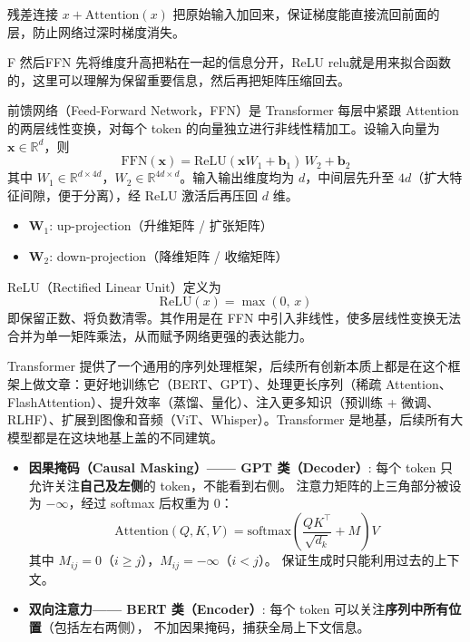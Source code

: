 \begin{note}
残差连接 $x + \mathrm{Attention}(x)$ 把原始输入加回来，保证梯度能直接流回前面的层，防止网络过深时梯度消失。
\end{note}
\begin{note}
   F 然后FFN 先将维度升高把粘在一起的信息分开，ReLU relu就是用来拟合函数的，这里可以理解为保留重要信息，然后再把矩阵压缩回去。
\end{note}
\begin{definition}
前馈网络（Feed-Forward Network，FFN）是 Transformer 每层中紧跟 Attention 的两层线性变换，对每个 token 的向量独立进行非线性精加工。设输入向量为 $\boldsymbol{x} \in \mathbb{R}^d$，则
\[
\mathrm{FFN}(\boldsymbol{x}) = \mathrm{ReLU}(\boldsymbol{x} W_1 + \boldsymbol{b}_1)\, W_2 + \boldsymbol{b}_2
\]
其中 $W_1 \in \mathbb{R}^{d \times 4d}$，$W_2 \in \mathbb{R}^{4d \times d}$。输入输出维度均为 $d$，中间层先升至 $4d$（扩大特征间隙，便于分离），经 ReLU 激活后再压回 $d$ 维。
\end{definition}
\begin{itemize}
    \item \textbf{W$_1$}: up-projection（升维矩阵 / 扩张矩阵）
    \item \textbf{W$_2$}: down-projection（降维矩阵 / 收缩矩阵）
\end{itemize}
\begin{definition}
ReLU（Rectified Linear Unit）定义为
\[
\mathrm{ReLU}(x) = \max(0,\, x)
\]
即保留正数、将负数清零。其作用是在 FFN 中引入非线性，使多层线性变换无法合并为单一矩阵乘法，从而赋予网络更强的表达能力。
\end{definition}
\begin{dxtips}
Transformer 提供了一个通用的序列处理框架，后续所有创新本质上都是在这个框架上做文章：更好地训练它（BERT、GPT）、处理更长序列（稀疏 Attention、FlashAttention）、提升效率（蒸馏、量化）、注入更多知识（预训练 + 微调、RLHF）、扩展到图像和音频（ViT、Whisper）。Transformer 是地基，后续所有大模型都是在这块地基上盖的不同建筑。
\end{dxtips}
\begin{itemize}
    \item \textbf{因果掩码（Causal Masking）—— GPT 类（Decoder）}:
    每个 token 只允许关注\textbf{自己及左侧}的 token，不能看到右侧。
    注意力矩阵的上三角部分被设为 $-\infty$，经过 softmax 后权重为 0：
    \[
    \text{Attention}(Q,K,V) = \text{softmax}\!\left(\frac{QK^\top}{\sqrt{d_k}} + M\right)V
    \]
    其中 $M_{ij} = 0$（$i \geq j$），$M_{ij} = -\infty$（$i < j$）。
    保证生成时只能利用过去的上下文。

    \item \textbf{双向注意力—— BERT 类（Encoder）}:
    每个 token 可以关注\textbf{序列中所有位置}（包括左右两侧），
    不加因果掩码，捕获全局上下文信息。
\end{itemize}